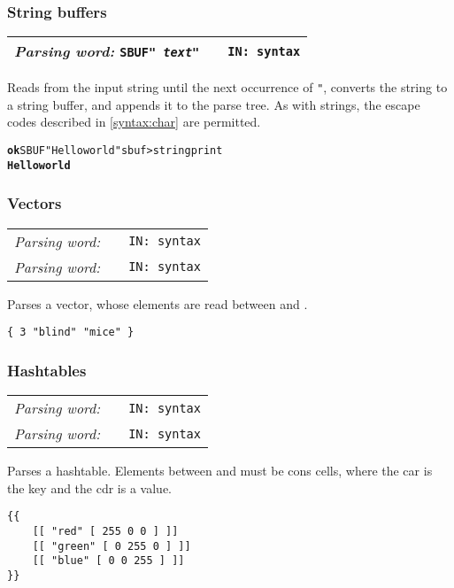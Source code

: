 \documentclass{report}
\newcommand{\tto}{\symbol{123}}
\newcommand{\ttc}{\symbol{125}}
\newcommand{\parsingword}[3]{\index{#1}
\emph{Parsing word:} \texttt{#2} &&\texttt{IN: #3}}
\newcommand{\wordtable}[1]{

\begin{tabularx}{12cm}[t]{lXr}
\hline
#1\\
\hline
\end{tabularx}

}
\begin{document}
\subsubsection{\label{sbuf-literals}String buffers}

\newcommand{\sbufglos}{
}
\sbufglos
\wordtable{
\parsingword{SBUF}{SBUF" \emph{text}"}{syntax}
}
Reads from the input string until the next occurrence of
\texttt{"}, converts the string to a string buffer, and appends it to the parse tree.
As with strings, the escape codes described in \ref{syntax:char} are permitted.
\begin{alltt}
\textbf{ok} SBUF" Hello world" sbuf>string print
\textbf{Hello world}
\end{alltt}

\subsubsection{\label{vector-literals}Vectors}
\newcommand{\vectorglos}{}
\vectorglos
\wordtable{
\parsingword{opencurly}{\tto}{syntax}\\
\parsingword{closecurly}{\ttc}{syntax}
}
Parses a vector, whose elements are read between \texttt{\tto} and \texttt{\ttc}.
\begin{verbatim}
{ 3 "blind" "mice" }
\end{verbatim}

\subsubsection{Hashtables}
\newcommand{\hashglos}{}
\hashglos
\wordtable{
\parsingword{openccurly}{\tto\tto}{syntax}\\
\parsingword{closeccurly}{\ttc\ttc}{syntax}
}
Parses a hashtable. Elements between \texttt{\tto\tto} and \texttt{\ttc\ttc} must be cons cells, where the car is the key and the cdr is a value.
\begin{verbatim}
{{
    [[ "red" [ 255 0 0 ] ]]
    [[ "green" [ 0 255 0 ] ]]
    [[ "blue" [ 0 0 255 ] ]]
}}
\end{verbatim}
\end{document}
